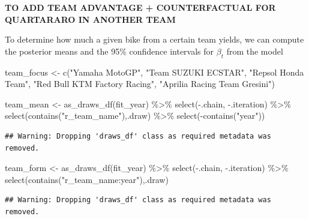 \documentclass[
]{article}
\newenvironment{Shaded}{\begin{snugshade}}{\end{snugshade}}
\newcommand{\FunctionTok}[1]{\textcolor[rgb]{0.00,0.00,0.00}{#1}}
\newcommand{\NormalTok}[1]{#1}
\newcommand{\OtherTok}[1]{\textcolor[rgb]{0.56,0.35,0.01}{#1}}
\newcommand{\SpecialCharTok}[1]{\textcolor[rgb]{0.00,0.00,0.00}{#1}}
\newcommand{\StringTok}[1]{\textcolor[rgb]{0.31,0.60,0.02}{#1}}
\begin{document}
\textbf{TO ADD TEAM ADVANTAGE + COUNTERFACTUAL FOR QUARTARARO IN ANOTHER
TEAM}

To determine how much a given bike from a certain team yields, we can
compute the posterior means and the 95\% confidence intervals for
\(\beta_t\) from the model

\begin{Shaded}
\begin{Highlighting}[]
\NormalTok{team\_focus }\OtherTok{\textless{}{-}} \FunctionTok{c}\NormalTok{(}\StringTok{"Yamaha MotoGP"}\NormalTok{, }\StringTok{"Team SUZUKI ECSTAR"}\NormalTok{, }\StringTok{"Repsol Honda Team"}\NormalTok{, }\StringTok{"Red Bull KTM Factory Racing"}\NormalTok{, }\StringTok{"Aprilia Racing Team Gresini"}\NormalTok{)}

\NormalTok{team\_mean }\OtherTok{\textless{}{-}} \FunctionTok{as\_draws\_df}\NormalTok{(fit\_year) }\SpecialCharTok{\%\textgreater{}\%} \FunctionTok{select}\NormalTok{(}\SpecialCharTok{{-}}\NormalTok{.chain, }\SpecialCharTok{{-}}\NormalTok{.iteration) }\SpecialCharTok{\%\textgreater{}\%} \FunctionTok{select}\NormalTok{(}\FunctionTok{contains}\NormalTok{(}\StringTok{"r\_team\_name"}\NormalTok{),.draw) }\SpecialCharTok{\%\textgreater{}\%} \FunctionTok{select}\NormalTok{(}\SpecialCharTok{{-}}\FunctionTok{contains}\NormalTok{(}\StringTok{"year"}\NormalTok{))}
\end{Highlighting}
\end{Shaded}

\begin{verbatim}
## Warning: Dropping 'draws_df' class as required metadata was removed.
\end{verbatim}

\begin{Shaded}
\begin{Highlighting}[]
\NormalTok{team\_form }\OtherTok{\textless{}{-}} \FunctionTok{as\_draws\_df}\NormalTok{(fit\_year) }\SpecialCharTok{\%\textgreater{}\%} \FunctionTok{select}\NormalTok{(}\SpecialCharTok{{-}}\NormalTok{.chain, }\SpecialCharTok{{-}}\NormalTok{.iteration) }\SpecialCharTok{\%\textgreater{}\%} \FunctionTok{select}\NormalTok{(}\FunctionTok{contains}\NormalTok{(}\StringTok{"r\_team\_name:year"}\NormalTok{),.draw) }
\end{Highlighting}
\end{Shaded}

\begin{verbatim}
## Warning: Dropping 'draws_df' class as required metadata was removed.
\end{verbatim}
\end{document}
